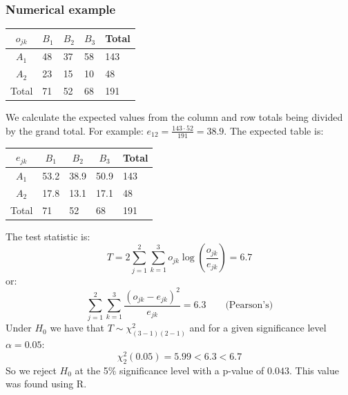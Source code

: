 \documentclass[12pt]{article}
\begin{document}
\subsubsection{Numerical example}
\begin{table}[H]
\centering
\begin{tabular}{l|lll|l}
\multicolumn{1}{c|}{\(o_{jk}\)}        & \multicolumn{1}{c}{\(B_1\)} & \multicolumn{1}{c}{\(B_2\)} & \multicolumn{1}{c|}{\(B_3\)} & Total \\ \hline
\multicolumn{1}{c|}{\(A_1\)}           & 48                          & 37                          & 58                           & 143   \\
\multicolumn{1}{c|}{\(A_2\)} & 23                          & 15                          & 10                           & 48    \\ \hline
Total                                  & 71                          & 52                          & 68                           & 191  
\end{tabular}
\end{table}
We calculate the expected values from the column and row totals being divided by the grand total. For example: \(e_{12}=\frac{143\cdot52}{191}=38.9\). The expected table is:
\begin{table}[H]
\centering
\begin{tabular}{l|lll|l}
\multicolumn{1}{c|}{\(e_{jk}\)} & \multicolumn{1}{c}{\(B_1\)} & \multicolumn{1}{c}{\(B_2\)} & \multicolumn{1}{c|}{\(B_3\)} & Total \\ \hline
\multicolumn{1}{c|}{\(A_1\)}    & 53.2                        & 38.9                        & 50.9                         & 143   \\
\multicolumn{1}{c|}{\(A_2\)}                         & 17.8                        & 13.1                        & 17.1                         & 48    \\ \hline
Total                           & 71                          & 52                          & 68                           & 191  
\end{tabular}
\end{table}
The test statistic is:
\[T=2\sum^2_{j=1}\sum^3_{k=1}o_{jk}\log\left(\frac{o_{jk}}{e_{jk}}\right)=6.7\]
or:
\[\sum^2_{j=1}\sum^3_{k=1}\frac{(o_{jk}-e_{jk})^2}{e_{jk}}=6.3\qquad \text{(Pearson's)}\]
Under \(H_0\) we have that \(T\sim\chi^2_{(3-1)(2-1)}\) and for a given significance level \(\alpha=0.05\):
\[\chi^2_{2}(0.05)=5.99<6.3<6.7\]
So we reject \(H_0\) at the 5\% significance level with a p-value of \(0.043\). This value was found using R.
\end{document}

